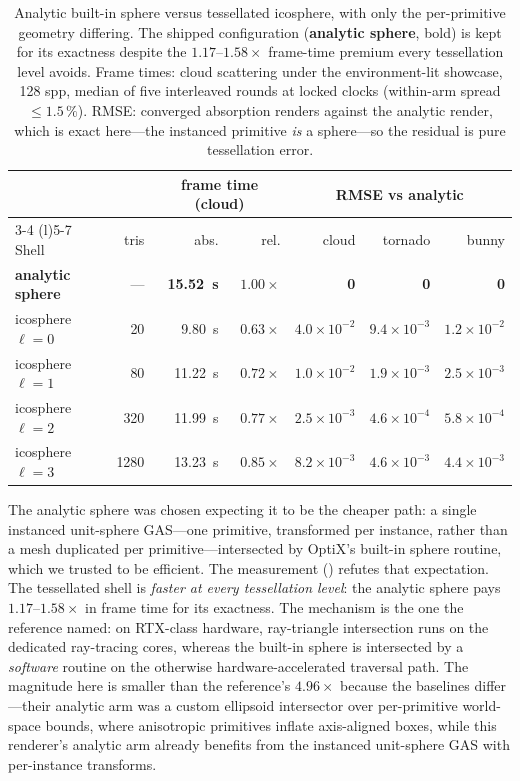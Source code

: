 \begin{table}[htp]
  \centering
  \setlength{\tabcolsep}{4pt}%
  \begin{tabular}{@{}lrrrrrr@{}}
    \toprule
    & & \multicolumn{2}{c}{frame time (cloud)} & \multicolumn{3}{c}{RMSE vs analytic} \\
    \cmidrule(lr){3-4} \cmidrule(l){5-7}
    Shell & tris & abs. & rel. & cloud & tornado & bunny \\
    \midrule
    \textbf{analytic sphere} & --- & \textbf{\SI{15.52}{\second}} & \textbf{$1.00\times$} & \textbf{0} & \textbf{0} & \textbf{0} \\
    icosphere $\ell{=}0$ & 20   & \SI{9.80}{\second}  & $0.63\times$ & $4.0\times10^{-2}$ & $9.4\times10^{-3}$ & $1.2\times10^{-2}$ \\
    icosphere $\ell{=}1$ & 80   & \SI{11.22}{\second} & $0.72\times$ & $1.0\times10^{-2}$ & $1.9\times10^{-3}$ & $2.5\times10^{-3}$ \\
    icosphere $\ell{=}2$ & 320  & \SI{11.99}{\second} & $0.77\times$ & $2.5\times10^{-3}$ & $4.6\times10^{-4}$ & $5.8\times10^{-4}$ \\
    icosphere $\ell{=}3$ & 1280 & \SI{13.23}{\second} & $0.85\times$ & $8.2\times10^{-3}$ & $4.6\times10^{-3}$ & $4.4\times10^{-3}$ \\
    \bottomrule
  \end{tabular}
  \caption{Analytic built-in sphere versus tessellated icosphere, with only the per-primitive geometry
  differing. The shipped configuration (\textbf{analytic sphere}, bold) is kept for its exactness despite
  the $1.17$--$1.58\times$ frame-time premium every tessellation level avoids. Frame times: cloud
  scattering under the environment-lit showcase, \num{128} spp, median of five interleaved rounds at
  locked clocks (within-arm spread ${\le}1.5\,\%$). RMSE: converged absorption renders against the
  analytic render, which is exact here---the instanced primitive \emph{is} a sphere---so the residual is
  pure tessellation error.}
  \label{tab:icosphere}
\end{table}

The analytic sphere was chosen expecting it to be the cheaper path: a single instanced unit-sphere
GAS---one primitive, transformed per instance, rather than a mesh duplicated per primitive---intersected
by OptiX's built-in sphere routine, which we trusted to be efficient. The measurement
() refutes that expectation. The tessellated shell is \emph{faster at every
tessellation level}: the analytic sphere pays $1.17$--$1.58\times$ in frame time for its exactness. The
mechanism is the one the reference named: on RTX-class hardware, ray-triangle intersection runs on the
dedicated ray-tracing cores, whereas the built-in sphere is intersected by a \emph{software} routine on
the otherwise hardware-accelerated traversal path. The magnitude
here is smaller than the reference's $4.96\times$ because the baselines differ---their analytic arm
was a custom ellipsoid intersector over per-primitive world-space bounds, where anisotropic primitives
inflate axis-aligned boxes, while this renderer's analytic arm already benefits from the instanced
unit-sphere GAS with per-instance transforms.

